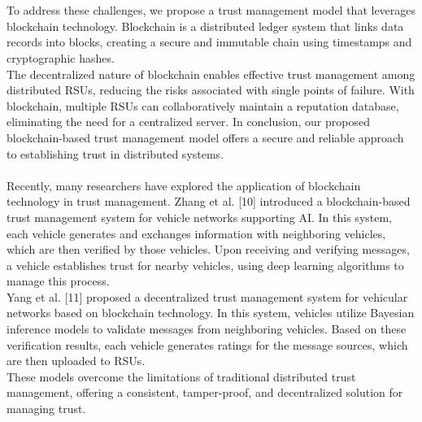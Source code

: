 \documentclass[11pt]{IEEEphot}
\begin{document}
\\
\\
To address these challenges, we propose a trust management model that leverages blockchain technology. Blockchain is a distributed ledger system that links data records into blocks, creating a secure and immutable chain using timestamps and cryptographic hashes. 
\\
The decentralized nature of blockchain enables effective trust management among distributed RSUs, reducing the risks associated with single points of failure. With blockchain, multiple RSUs can collaboratively maintain a reputation database, eliminating the need for a centralized server. In conclusion, our proposed blockchain-based trust management model offers a secure and reliable approach to establishing trust in distributed systems.
\\
\\
Recently, many researchers have explored the application of blockchain technology in trust management. Zhang et al. [10] introduced a blockchain-based trust management system for vehicle networks supporting AI. In this system, each vehicle generates and exchanges information with neighboring vehicles, which are then verified by those vehicles. Upon receiving and verifying messages, a vehicle establishes trust for nearby vehicles, using deep learning algorithms to manage this process. 
\\
Yang et al. [11] proposed a decentralized trust management system for vehicular networks based on blockchain technology. In this system, vehicles utilize Bayesian inference models to validate messages from neighboring vehicles. Based on these verification results, each vehicle generates ratings for the message sources, which are then uploaded to RSUs. 
\\
These models overcome the limitations of traditional distributed trust management, offering a consistent, tamper-proof, and decentralized solution for managing trust.





 
\end{document}
